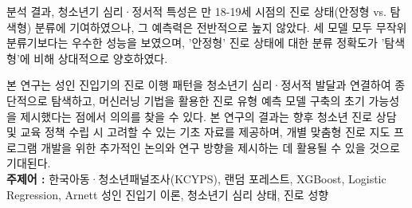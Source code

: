 \begin{center}
  분석 결과, 청소년기 심리·정서적 특성은 만 18-19세 시점의 진로 상태(안정형 vs. 탐색형) 분류에 기여하였으나, 그 예측력은 전반적으로 높지 않았다. 세 모델 모두 무작위 분류기보다는 우수한 성능을 보였으며, '안정형' 진로 상태에 대한 분류 정확도가 '탐색형'에 비해 상대적으로 양호하였다.

  본 연구는 성인 진입기의 진로 이행 패턴을 청소년기 심리·정서적 발달과 연결하여 종단적으로 탐색하고, 머신러닝 기법을 활용한 진로 유형 예측 모델 구축의 초기 가능성을 제시했다는 점에서 의의를 찾을 수 있다. 본 연구의 결과는 향후 청소년 진로 상담 및 교육 정책 수립 시 고려할 수 있는 기초 자료를 제공하며, 개별 맞춤형 진로 지도 프로그램 개발을 위한 추가적인 논의와 연구 방향을 제시하는 데 활용될 수 있을 것으로 기대된다.
  \vspace{0.5em}
  \\
  \noindent\textbf{주제어 :} 한국아동·청소년패널조사(KCYPS), 랜덤 포레스트, XGBoost, Logistic Regression, Arnett 성인 진입기 이론, 청소년기 심리 상태, 진로 성향

  \vspace{1em}

\end{center}
